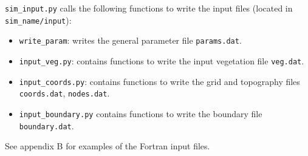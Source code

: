 \documentclass{article}
\newcommand{\code}[1]{\texttt{#1}}
\begin{document}
\code{sim\_input.py} calls the following functions to write the input files (located in \code{sim\_name/input}):
\begin{itemize}
	\item \code{write\_param}: writes the general parameter file  \code{params.dat}.
	\item \code{input\_veg.py}: contains functions to write the input vegetation file \code{veg.dat}.
	\item \code{input\_coords.py}: contains functions to write the  grid and topography files \code{coords.dat}, \code{nodes.dat}. 
	\item \code{input\_boundary.py} contains functions to write the boundary file \code{boundary.dat}.
\end{itemize}

See appendix B for examples of the Fortran input files.
\end{document}

